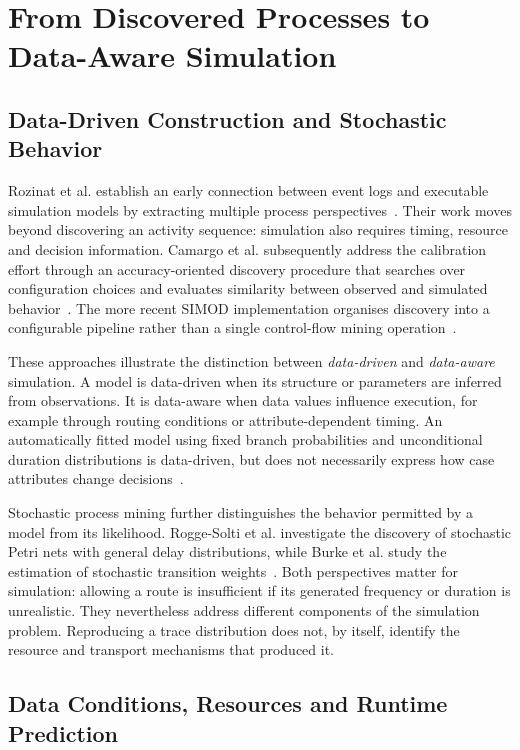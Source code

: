 \section{From Discovered Processes to Data-Aware Simulation}
\label{sec:rw_data_aware}

\subsection{Data-Driven Construction and Stochastic Behavior}

Rozinat et al. establish an early connection between event logs and executable simulation models by extracting multiple process perspectives~\cite{PMRozinat2009}. Their work moves beyond discovering an activity sequence: simulation also requires timing, resource and decision information. Camargo et al. subsequently address the calibration effort through an accuracy-oriented discovery procedure that searches over configuration choices and evaluates similarity between observed and simulated behavior~\cite{Camargo2020}. The more recent SIMOD implementation organises discovery into a configurable pipeline rather than a single control-flow mining operation~\cite{simod2024}.

These approaches illustrate the distinction between \emph{data-driven} and \emph{data-aware} simulation. A model is data-driven when its structure or parameters are inferred from observations. It is data-aware when data values influence execution, for example through routing conditions or attribute-dependent timing. An automatically fitted model using fixed branch probabilities and unconditional duration distributions is data-driven, but does not necessarily express how case attributes change decisions~\cite{lopez2024}.

Stochastic process mining further distinguishes the behavior permitted by a model from its likelihood. Rogge-Solti et al. investigate the discovery of stochastic Petri nets with general delay distributions, while Burke et al. study the estimation of stochastic transition weights~\cite{stochastikPetriNets2013Solti,burke2020stochasticPD}. Both perspectives matter for simulation: allowing a route is insufficient if its generated frequency or duration is unrealistic. They nevertheless address different components of the simulation problem. Reproducing a trace distribution does not, by itself, identify the resource and transport mechanisms that produced it.

\subsection{Data Conditions, Resources and Runtime Prediction}


